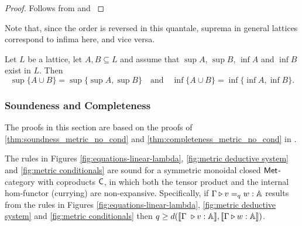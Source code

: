 \begin{proof}
  Follows from \cite[Section 3]{dahlqvist2023syntactic}  and  \cite[Proposition I-1.8]{gierzContinuousLatticesDomains2003}
\end{proof}

Note that, since the order is reversed in this quantale, suprema in general lattices correspond to infima here, and vice versa.

\begin{lemma} \cite[Lemma 2.23]{daveyIntroductionLatticesOrder2002} \label{lem:sup_union}
Let \( L \) be a lattice, let \( A, B \subseteq L \) and assume that \( \sup A \),
\( \sup B \), \( \inf A \) and \( \inf B \) exist in \( L \). Then
$$ \sup\{A \cup B\} = \sup\{ \sup A, \sup B \}  \quad \text{and} \quad \inf\{A \cup B\} = \inf\{ \inf A, \inf B \}
 . $$
\end{lemma}




\subsubsection{Soundeness and Completeness}
The proofs in this section are based on the proofs of 
\autoref{thm:soundness_metric_no_cond} and \autoref{thm:completeness_metric_no_cond} in \cite{dahlqvist2023syntactic}.

\begin{theorem}
  The rules in Figures \ref{fig:equations-linear-lambda}, \ref{fig:metric deductive system} and \ref{fig:metric conditionals} are sound for a  symmetric monoidal closed $\mathsf{Met}$-category with coproducts $\mathsf{C}$, in which both the tensor product and the internal hom-functor (currying) are non-expansive. Specifically, if $\Gamma \triangleright v =_{q} w : \mathbb{A} $ results from the rules in Figures  \ref{fig:equations-linear-lambda}, \ref{fig:metric deductive system} and \ref{fig:metric conditionals} then $q \geq d( \llbracket \Gamma  \vljud v : \typeA \rrbracket, \llbracket\Gamma \vljud w : \typeA \rrbracket)$.
\end{theorem}

